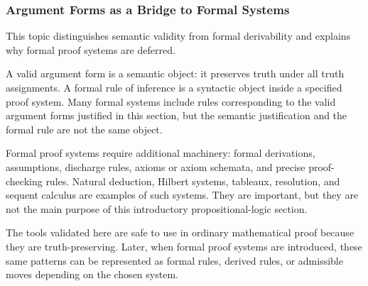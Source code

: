 \subsubsection*{Argument Forms as a Bridge to Formal Systems}

\begin{remark*}
This topic distinguishes semantic validity from formal derivability and explains
why formal proof systems are deferred.
\end{remark*}

\begin{remark*}[Exposition]
A valid argument form is a semantic object: it preserves truth under all truth
assignments. A formal rule of inference is a syntactic object inside a specified
proof system. Many formal systems include rules corresponding to the valid
argument forms justified in this section, but the semantic justification and the
formal rule are not the same object.
\end{remark*}

\begin{remark*}[Exposition]
Formal proof systems require additional machinery: formal derivations,
assumptions, discharge rules, axioms or axiom schemata, and precise proof-checking
rules. Natural deduction, Hilbert systems, tableaux, resolution, and sequent
calculus are examples of such systems. They are important, but they are not the
main purpose of this introductory propositional-logic section.
\end{remark*}

\begin{remark*}[Transition]
The tools validated here are safe to use in ordinary mathematical proof because
they are truth-preserving. Later, when formal proof systems are introduced, these
same patterns can be represented as formal rules, derived rules, or admissible
moves depending on the chosen system.
\end{remark*}
